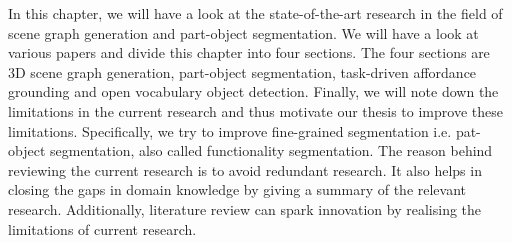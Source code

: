 In this chapter, we will have a look at the state-of-the-art research in the field of scene graph generation and part-object segmentation. We will have a look at various papers and divide this chapter into four sections. The four sections are 3D scene graph generation, part-object segmentation,
task-driven affordance grounding and open vocabulary object detection. Finally, we will note down the limitations in the current research and thus motivate our thesis to improve these limitations. Specifically, we try to improve fine-grained segmentation i.e. pat-object segmentation, also called functionality segmentation. The reason behind reviewing the current research is to avoid redundant research. It also helps in closing the gaps in domain knowledge by giving a summary of the relevant research. Additionally, literature review can spark innovation by realising
the limitations of current research.
 
